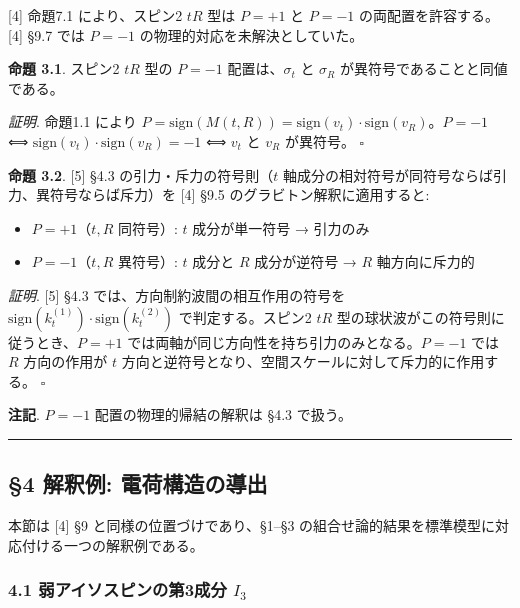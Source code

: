 \documentclass[
  a4paper,11pt]{ltjsarticle}
\providecommand{\tightlist}{%
  \setlength{\itemsep}{0pt}\setlength{\parskip}{0pt}}
\begin{document}
{[}4{]} 命題7.1 により、スピン2 \(tR\) 型は \(P = +1\) と \(P = -1\)
の両配置を許容する。{[}4{]} §9.7 では \(P = -1\)
の物理的対応を未解決としていた。

\textbf{命題 3.1}. スピン2 \(tR\) 型の \(P = -1\) 配置は、\(\sigma_t\)
と \(\sigma_R\) が異符号であることと同値である。

\emph{証明}. 命題1.1 により
\(P = \text{sign}(M(t, R)) = \text{sign}(v_t) \cdot \text{sign}(v_R)\)。\(P = -1\)
⟺ \(\text{sign}(v_t) \cdot \text{sign}(v_R) = -1\) ⟺ \(v_t\) と \(v_R\)
が異符号。 \(\square\)

\textbf{命題 3.2}. {[}5{]} §4.3 の引力・斥力の符号則（\(t\)
軸成分の相対符号が同符号ならば引力、異符号ならば斥力）を {[}4{]} §9.5
のグラビトン解釈に適用すると:

\begin{itemize}
\tightlist
\item
  \(P = +1\)（\(t, R\) 同符号）: \(t\) 成分が単一符号 → 引力のみ
\item
  \(P = -1\)（\(t, R\) 異符号）: \(t\) 成分と \(R\) 成分が逆符号 → \(R\)
  軸方向に斥力的
\end{itemize}

\emph{証明}. {[}5{]} §4.3 では、方向制約波間の相互作用の符号を
\(\text{sign}(k_t^{(1)}) \cdot \text{sign}(k_t^{(2)})\)
で判定する。スピン2 \(tR\) 型の球状波がこの符号則に従うとき、\(P = +1\)
では両軸が同じ方向性を持ち引力のみとなる。\(P = -1\) では \(R\)
方向の作用が \(t\)
方向と逆符号となり、空間スケールに対して斥力的に作用する。 \(\square\)

\textbf{注記}. \(P = -1\) 配置の物理的帰結の解釈は §4.3 で扱う。

\begin{center}\rule{0.5\linewidth}{0.5pt}\end{center}

\subsection{§4 解釈例:
電荷構造の導出}\label{ux89e3ux91c8ux4f8b-ux96fbux8377ux69cbux9020ux306eux5c0eux51fa}

本節は {[}4{]} §9 と同様の位置づけであり、§1--§3
の組合せ論的結果を標準模型に対応付ける一つの解釈例である。

\subsubsection{\texorpdfstring{4.1 弱アイソスピンの第3成分
\(I_3\)}{4.1 弱アイソスピンの第3成分 I\_3}}\label{ux5f31ux30a2ux30a4ux30bdux30b9ux30d4ux30f3ux306eux7b2c3ux6210ux5206-i_3}
\end{document}
